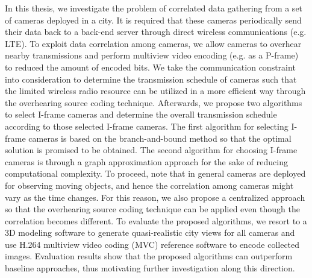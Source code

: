 In this thesis, we investigate the problem of correlated data gathering from a set of cameras deployed in a city.
It is required that these cameras periodically send their data back to a back-end server through direct wireless communications (e.g. LTE).
To exploit data correlation among cameras, we allow cameras to overhear nearby transmissions and perform multiview video encoding (e.g. as a P-frame) to reduced the amount of encoded bits.
We take the communication constraint into consideration to determine the transmission schedule of cameras such that the limited wireless radio resource can be utilized in a more efficient way through the overhearing source coding technique.
Afterwards, we propose two algorithms to select I-frame cameras and determine the overall transmission schedule according to those selected I-frame cameras.
The first algorithm for selecting I-frame cameras is based on the branch-and-bound method so that the optimal solution is promised to be obtained.
The second algorithm for choosing I-frame cameras is through a graph approximation approach for the sake of reducing computational complexity.
To proceed, note that in general cameras are deployed for observing moving objects, and hence the correlation among cameras might vary as the time changes.
For this reason, we also propose a centralized approach so that the overhearing source coding technique can be applied even though the correlation becomes different.
To evaluate the proposed algorithms, we resort to a 3D modeling software to generate quasi-realistic city views for all cameras and use H.264 multiview video coding (MVC) reference software to encode collected images.
Evaluation results show that the proposed algorithms can outperform baseline approaches, thus motivating further investigation along this direction.

